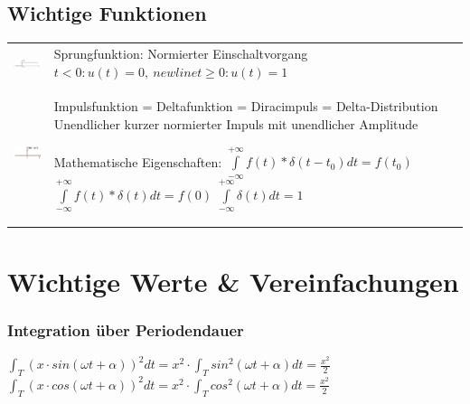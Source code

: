\documentclass[margin=normal]{tex/hsrzf}
\begin{document}
\subsection{Wichtige Funktionen}
\begin{tabular}{p{5cm} p{10cm}}
  \includegraphics[width = 2.5cm]{img/Sprungfunktion.png} & 
  Sprungfunktion: \newline
  Normierter Einschaltvorgang \newline 
  $ t<0 : u(t) = 0, \ newline
  t \geqslant 0: u(t) = 1 $ \\

  \includegraphics[width = 2.5cm]{img/Impulsfunktion.png} &
  Impulsfunktion = Deltafunktion = \newline 
  Diracimpuls = Delta-Distribution \newline
  Unendlicher kurzer normierter Impuls mit unendlicher Amplitude

  Mathematische Eigenschaften:
$\int\limits _{-\infty} ^{+\infty} f(t) * \delta (t-t_0) dt = f(t_0)$ \newline
$\int\limits _{-\infty} ^{+\infty} f(t) * \delta (t) dt = f(0)$\newline
$\int\limits _{-\infty} ^{+\infty} \delta (t) dt = 1$ \\

\end{tabular}




\section*{Wichtige Werte \& Vereinfachungen}
\subsubsection*{Integration über Periodendauer}
$\int_T (x \cdot sin(\omega t + \alpha))^2 dt = x^2 \cdot \int_T sin^2(\omega t +\alpha) dt = \frac{x^2}{2}$
$\int_T (x \cdot cos(\omega t+\alpha))^2 dt = x^2 \cdot \int_T cos^2(\omega t+\alpha) dt = \frac{x^2}{2}$
\end{document}
